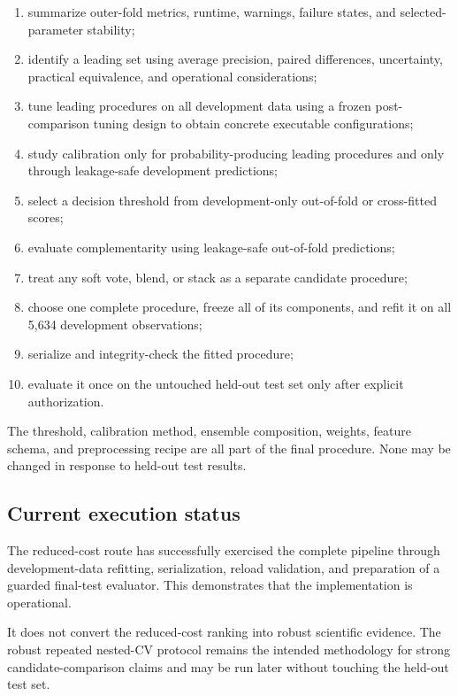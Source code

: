 \begin{enumerate}
    \item summarize outer-fold metrics, runtime, warnings, failure states, and selected-parameter stability;
    \item identify a leading set using average precision, paired differences, uncertainty, practical equivalence, and operational considerations;
    \item tune leading procedures on all development data using a frozen post-comparison tuning design to obtain concrete executable configurations;
    \item study calibration only for probability-producing leading procedures and only through leakage-safe development predictions;
    \item select a decision threshold from development-only out-of-fold or cross-fitted scores;
    \item evaluate complementarity using leakage-safe out-of-fold predictions;
    \item treat any soft vote, blend, or stack as a separate candidate procedure;
    \item choose one complete procedure, freeze all of its components, and refit it on all 5,634 development observations;
    \item serialize and integrity-check the fitted procedure;
    \item evaluate it once on the untouched held-out test set only after explicit authorization.
\end{enumerate}

The threshold, calibration method, ensemble composition, weights, feature schema, and preprocessing recipe are all part of the final procedure. None may be changed in response to held-out test results.

\subsection{Current execution status}

The reduced-cost route has successfully exercised the complete pipeline through development-data refitting, serialization, reload validation, and preparation of a guarded final-test evaluator. This demonstrates that the implementation is operational.

It does not convert the reduced-cost ranking into robust scientific evidence. The robust repeated nested-CV protocol remains the intended methodology for strong candidate-comparison claims and may be run later without touching the held-out test set.


